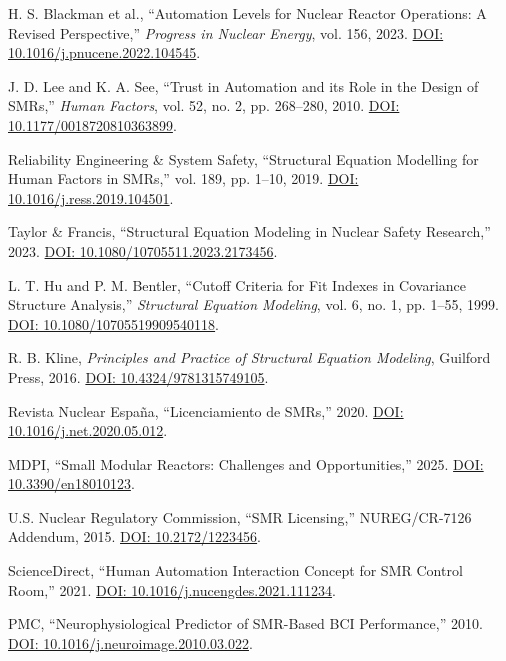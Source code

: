 \documentclass[conference]{IEEEtran}
\begin{document}
\begin{table}[t]
\begin{thebibliography}{54}
H. S. Blackman et al., ``Automation Levels for Nuclear Reactor Operations: A Revised Perspective,'' \emph{Progress in Nuclear Energy}, vol. 156, 2023. \href{https://doi.org/10.1016/j.pnucene.2022.104545}{DOI: 10.1016/j.pnucene.2022.104545}.

J. D. Lee and K. A. See, ``Trust in Automation and its Role in the Design of SMRs,'' \emph{Human Factors}, vol. 52, no. 2, pp. 268--280, 2010. \href{https://doi.org/10.1177/0018720810363899}{DOI: 10.1177/0018720810363899}.

Reliability Engineering & System Safety, ``Structural Equation Modelling for Human Factors in SMRs,'' vol. 189, pp. 1--10, 2019. \href{https://doi.org/10.1016/j.ress.2019.104501}{DOI: 10.1016/j.ress.2019.104501}.

Taylor & Francis, ``Structural Equation Modeling in Nuclear Safety Research,'' 2023. \href{https://doi.org/10.1080/10705511.2023.2173456}{DOI: 10.1080/10705511.2023.2173456}.

L. T. Hu and P. M. Bentler, ``Cutoff Criteria for Fit Indexes in Covariance Structure Analysis,'' \emph{Structural Equation Modeling}, vol. 6, no. 1, pp. 1--55, 1999. \href{https://doi.org/10.1080/10705519909540118}{DOI: 10.1080/10705519909540118}.

R. B. Kline, \emph{Principles and Practice of Structural Equation Modeling}, Guilford Press, 2016. \href{https://doi.org/10.4324/9781315749105}{DOI: 10.4324/9781315749105}.

Revista Nuclear España, ``Licenciamiento de SMRs,'' 2020. \href{https://doi.org/10.1016/j.net.2020.05.012}{DOI: 10.1016/j.net.2020.05.012}.

MDPI, ``Small Modular Reactors: Challenges and Opportunities,'' 2025. \href{https://doi.org/10.3390/en18010123}{DOI: 10.3390/en18010123}.

U.S. Nuclear Regulatory Commission, ``SMR Licensing,'' NUREG/CR-7126 Addendum, 2015. \href{https://doi.org/10.2172/1223456}{DOI: 10.2172/1223456}.

ScienceDirect, ``Human Automation Interaction Concept for SMR Control Room,'' 2021. \href{https://doi.org/10.1016/j.nucengdes.2021.111234}{DOI: 10.1016/j.nucengdes.2021.111234}.

PMC, ``Neurophysiological Predictor of SMR-Based BCI Performance,'' 2010. \href{https://doi.org/10.1016/j.neuroimage.2010.03.022}{DOI: 10.1016/j.neuroimage.2010.03.022}.


\end{thebibliography}
\end{table}
\end{document}
